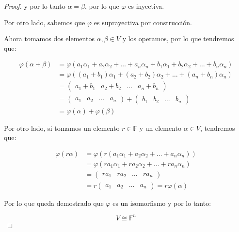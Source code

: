 \begin{proof}
			y por lo tanto $\alpha = \beta$, por lo que $\varphi$ es inyectiva.

			Por otro lado, sabemos que $\varphi$ es suprayectiva por construcción.

			Ahora tomamos dos elementos $\alpha, \beta \in V$ y los operamos, por lo que tendremos que:

			\begin{align*}
				\varphi(\alpha + \beta) &= \varphi(a_1 \alpha_1 + a_2 \alpha_2 + \dots + a_n \alpha_n + b_1 \alpha_1 + b_2 \alpha_2 + \dots + b_n \alpha_n) \\
				&= \varphi((a_1 + b_1) \alpha_1 + (a_2 + b_2) \alpha_2 + \dots + (a_n + b_n) \alpha_n) \\
				&= \begin{pmatrix} a_1 + b_1 & a_2 + b_2 & \dots & a_n + b_n \end{pmatrix} \\
				&= \begin{pmatrix} a_1 & a_2 & \dots & a_n \end{pmatrix} + \begin{pmatrix} b_1 & b_2 & \dots & b_n \end{pmatrix} \\
				&= \varphi(\alpha) + \varphi(\beta)
			\end{align*}

			Por otro lado, si tomamos un elemento $r \in \mathbb{F}$ y un elemento $\alpha \in V$, tendremos que:

			\begin{align*}
				\varphi(r \alpha) &= \varphi(r (a_1 \alpha_1 + a_2 \alpha_2 + \dots + a_n \alpha_n)) \\
				&= \varphi(r a_1 \alpha_1 + r a_2 \alpha_2 + \dots + r a_n \alpha_n) \\
				&= \begin{pmatrix} r a_1 & r a_2 & \dots & r a_n \end{pmatrix} \\
				&= r \begin{pmatrix} a_1 & a_2 & \dots & a_n \end{pmatrix} = r \varphi(\alpha)
			\end{align*}

			Por lo que queda demostrado que $\varphi$ es un isomorfismo y por lo tanto:

			\begin{equation*}
				V \cong \mathbb{F}^n
			\end{equation*}
		\end{proof}

